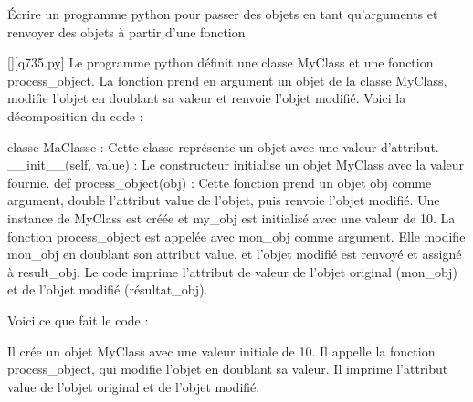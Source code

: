         \question
        Écrire un programme python pour passer des objets en tant qu'arguments et renvoyer des objets à partir d'une fonction
        \par
        \begin{solution}
            \renewcommand{\nomfichier}{q735.py}
            \pythonfile{\chemincode \nomfichier}[][\nomfichier]
            Le programme python définit une classe MyClass et une fonction process_object. La fonction prend en argument un objet de la classe MyClass, modifie l'objet en doublant sa valeur et renvoie l'objet modifié. Voici la décomposition du code :

    classe MaClasse : Cette classe représente un objet avec une valeur d'attribut.
    __init__(self, value) : Le constructeur initialise un objet MyClass avec la valeur fournie.
    def process_object(obj) : Cette fonction prend un objet obj comme argument, double l'attribut value de l'objet, puis renvoie l'objet modifié.
    Une instance de MyClass est créée et my_obj est initialisé avec une valeur de 10.
    La fonction process_object est appelée avec mon_obj comme argument. Elle modifie mon_obj en doublant son attribut value, et l'objet modifié est renvoyé et assigné à result_obj.
    Le code imprime l'attribut de valeur de l'objet original (mon_obj) et de l'objet modifié (résultat_obj).

Voici ce que fait le code :

    Il crée un objet MyClass avec une valeur initiale de 10.
    Il appelle la fonction process_object, qui modifie l'objet en doublant sa valeur.
    Il imprime l'attribut value de l'objet original et de l'objet modifié.
        \end{solution}
        

